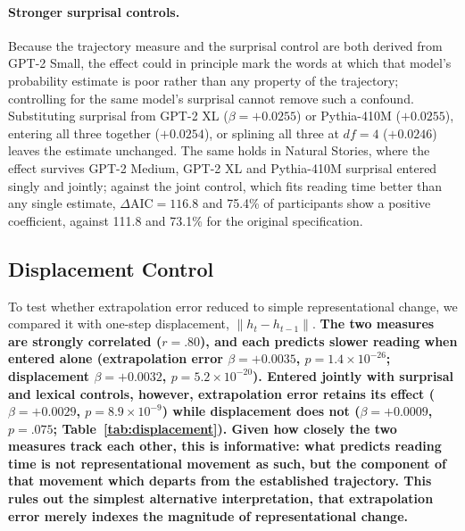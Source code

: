 \documentclass[12pt]{article}
\newcommand{\new}[1]{{\bfseries #1}}
\begin{document}
{\paragraph{Stronger surprisal controls.} Because the trajectory measure and the surprisal control are both derived from GPT-2 Small, the effect could in principle mark the words at which that model's probability estimate is poor rather than any property of the trajectory; controlling for the same model's surprisal cannot remove such a confound. Substituting surprisal from GPT-2 XL ($\beta = +0.0255$) or Pythia-410M ($+0.0255$), entering all three together ($+0.0254$), or splining all three at $df = 4$ ($+0.0246$) leaves the estimate unchanged. The same holds in Natural Stories, where the effect survives GPT-2 Medium, GPT-2 XL and Pythia-410M surprisal entered singly and jointly; against the joint control, which fits reading time better than any single estimate, $\Delta\text{AIC} = 116.8$ and 75.4\% of participants show a positive coefficient, against 111.8 and 73.1\% for the original specification.}

\subsection{Displacement Control}

To test whether extrapolation error reduced to simple representational change, we compared it with one-step displacement, $\|h_t - h_{t-1}\|$. \new{The two measures are strongly correlated ($r = .80$), and each predicts slower reading when entered alone (extrapolation error $\beta = +0.0035$, $p = 1.4 \times 10^{-26}$; displacement $\beta = +0.0032$, $p = 5.2 \times 10^{-20}$). Entered jointly with surprisal and lexical controls, however, extrapolation error retains its effect ($\beta = +0.0029$, $p = 8.9 \times 10^{-9}$) while displacement does not ($\beta = +0.0009$, $p = .075$; Table~\ref{tab:displacement}). Given how closely the two measures track each other, this is informative: what predicts reading time is not representational movement as such, but the component of that movement which departs from the established trajectory. This rules out the simplest alternative interpretation, that extrapolation error merely indexes the magnitude of representational change.}
\end{document}
